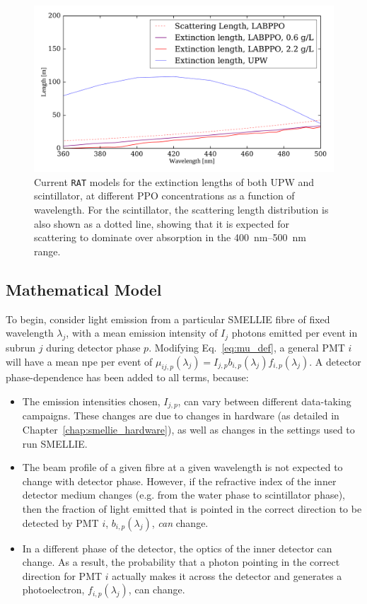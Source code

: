 \begin{figure}
    \centering
    \includegraphics[width=\textwidth]{5_SMELLIEAnalysis/images/ext_length_expectations_RAT_nice.pdf}
    \caption[Current \texttt{RAT} models for the extinction lengths of both UPW and scintillator, as a function of wavelength]
    {Current \texttt{RAT} models for the extinction lengths of both UPW and scintillator, at different PPO concentrations as a function of wavelength. For the scintillator, the scattering length distribution is also shown as a dotted line, showing that it is expected for scattering to dominate over absorption in the \SIrange{400}{500}{\nm} range.}
    \label{fig:smellie_expected_ext_length_phases}
\end{figure}

\subsection{Mathematical Model}
To begin, consider light emission from a particular SMELLIE fibre of fixed wavelength $\lambda_{j}$, with a mean emission intensity of $I_{j}$ photons emitted per event in subrun $j$ during detector phase $p$. Modifying Eq.~\ref{eq:mu_def}, a general PMT $i$ will have a mean npe per event of $\mu_{ij,p}(\lambda_{j}) = I_{j,p}b_{i,p}(\lambda_{j})f_{i,p}(\lambda_{j})$. A detector phase-dependence has been added to all terms, because:
\begin{itemize}
    \item The emission intensities chosen, $I_{j,p}$, can vary between different data-taking campaigns. These changes are due to changes in hardware (as detailed in Chapter~\ref{chap:smellie_hardware}), as well as changes in the settings used to run SMELLIE.
    \item The beam profile of a given fibre at a given wavelength is not expected to change with detector phase. However, if the refractive index of the inner detector medium changes (e.g. from the water phase to scintillator phase), then the fraction of light emitted that is pointed in the correct direction to be detected by PMT $i$, $b_{i,p}(\lambda_{j})$, \textit{can} change.
    \item In a different phase of the detector, the optics of the inner detector can change. As a result, the probability that a photon pointing in the correct direction for PMT $i$ actually makes it across the detector and generates a photoelectron, $f_{i,p}(\lambda_{j})$, can change.
\end{itemize}

